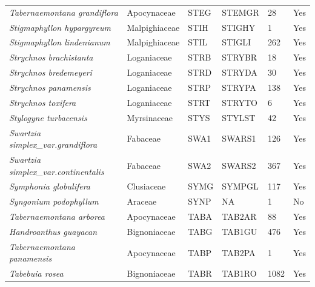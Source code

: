 \documentclass[11pt]{article}
\begin{document}
\begin{longtable}{@{}llllll@{}}
\textit{Tabernaemontana grandiflora}                  & Apocynaceae      & STEG   & STEMGR & 28              & Yes       \\
\textit{Stigmaphyllon hypargyreum}                    & Malpighiaceae    & STIH   & STIGHY & 1               & Yes       \\
\textit{Stigmaphyllon lindenianum}                    & Malpighiaceae    & STIL   & STIGLI & 262             & Yes       \\
\textit{Strychnos brachistanta}                       & Loganiaceae      & STRB   & STRYBR & 18              & Yes       \\
\textit{Strychnos bredemeyeri}                        & Loganiaceae      & STRD   & STRYDA & 30              & Yes       \\
\textit{Strychnos panamensis}                         & Loganiaceae      & STRP   & STRYPA & 138             & Yes       \\
\textit{Strychnos toxifera}                           & Loganiaceae      & STRT   & STRYTO & 6               & Yes       \\
\textit{Stylogyne turbacensis}                        & Myrsinaceae      & STYS   & STYLST & 42              & Yes       \\
\textit{Swartzia simplex\_var.grandiflora}            & Fabaceae         & SWA1   & SWARS1 & 126             & Yes       \\
\textit{Swartzia simplex\_var.continentalis}          & Fabaceae         & SWA2   & SWARS2 & 367             & Yes       \\
\textit{Symphonia globulifera}                        & Clusiaceae       & SYMG   & SYMPGL & 117             & Yes       \\
\textit{Syngonium podophyllum}                        & Araceae          & SYNP   & NA     & 1               & No        \\
\textit{Tabernaemontana arborea}                      & Apocynaceae      & TABA   & TAB2AR & 88              & Yes       \\
\textit{Handroanthus guayacan}                        & Bignoniaceae     & TABG   & TAB1GU & 476             & Yes       \\
\textit{Tabernaemontana panamensis}                   & Apocynaceae      & TABP   & TAB2PA & 1               & Yes       \\
\textit{Tabebuia rosea}                               & Bignoniaceae     & TABR   & TAB1RO & 1082            & Yes       \\

\end{longtable}
\end{document}
